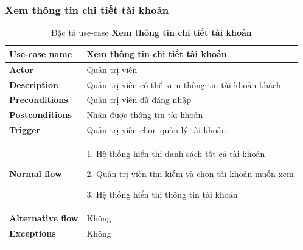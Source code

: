         \subsubsection{Xem thông tin chi tiết tài khoản}
        {
\setlength\extrarowheight{6pt}
            \begin{longtable}{| p{} | p{} |} 
                \hline
                    \textbf{Use-case name} 
                & 
                    Xem thông tin chi tiết tài khoản
                \\
                \hline
                    \textbf{Actor} 
                & 
                    Quản trị viên
                \\
                \hline
                    \textbf{Description} 
                & 
                    Quản trị viên có thể xem thông tin tài khoản khách
                \\
                \hline
                    \textbf{Preconditions} 
                &
                    Quản trị viên đã đăng nhập
                \\
                \hline
                    \textbf{Postconditions} 
                & 
                    Nhận được thông tin tài khoản
                \\
                \hline
                    \textbf{Trigger} 
                & 
                    Quản trị viên chọn quản lý tài khoản
                \\
                \hline
                \begin{flushleft}
                    \textbf{Normal flow}
                \end{flushleft}
                & 
                1. Hệ thống hiển thị danh sách tất cả tài khoản
                    
                    2. Quản trị viên tìm kiếm và chọn tài khoản muốn xem
                    
                    3. Hệ thống hiển thị thông tin tài khoản
                \\
                \hline
                    \textbf{Alternative flow}
                &
                    Không
                \\
                \hline
                    \textbf{Exceptions} 
                &
                    Không
                \\
                \hline
                \caption{Đặc tả use-case \textbf{Xem thông tin chi tiết tài khoản}}
            \end{longtable}
        }


